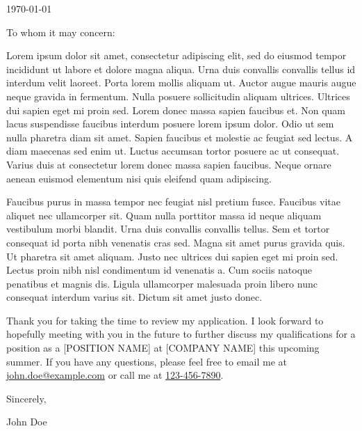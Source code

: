 \documentclass{ExpressiveCoverLetter}
\begin{document}
{}{}
{}{}

\vspace{0.25in}
\today
\vspace{0.15in}


To whom it may concern:

Lorem ipsum dolor sit amet, consectetur adipiscing elit, sed do eiusmod
tempor incididunt ut labore et dolore magna aliqua. Urna duis convallis
convallis tellus id interdum velit laoreet. Porta lorem mollis aliquam
ut. Auctor augue mauris augue neque gravida in fermentum. Nulla posuere
sollicitudin aliquam ultrices. Ultrices dui sapien eget mi proin sed.
Lorem donec massa sapien faucibus et. Non quam lacus suspendisse
faucibus interdum posuere lorem ipsum dolor. Odio ut sem nulla pharetra
diam sit amet. Sapien faucibus et molestie ac feugiat sed lectus. A
diam maecenas sed enim ut. Luctus accumsan tortor posuere ac ut
consequat. Varius duis at consectetur lorem donec massa sapien
faucibus. Neque ornare aenean euismod elementum nisi quis eleifend quam
adipiscing.

Faucibus purus in massa tempor nec feugiat nisl pretium fusce. Faucibus
vitae aliquet nec ullamcorper sit. Quam nulla porttitor massa id neque
aliquam vestibulum morbi blandit. Urna duis convallis convallis tellus.
Sem et tortor consequat id porta nibh venenatis cras sed. Magna sit
amet purus gravida quis. Ut pharetra sit amet aliquam. Justo nec
ultrices dui sapien eget mi proin sed. Lectus proin nibh nisl
condimentum id venenatis a. Cum sociis natoque penatibus et magnis dis.
Ligula ullamcorper malesuada proin libero nunc consequat interdum
varius sit. Dictum sit amet justo donec.

Thank you for taking the time to review my application. I look forward
to hopefully meeting with you in the future to further discuss my
qualifications for a position as a [POSITION NAME] at [COMPANY NAME]
this upcoming summer. If you have any questions, please feel free to
email me at \href{mailto:john.doe@example.com}{john.doe@example.com} or
call me at \href{tel:+1-123-456-7890}{123-456-7890}.

Sincerely,

\vspace{.15in}

John Doe
\end{document}

